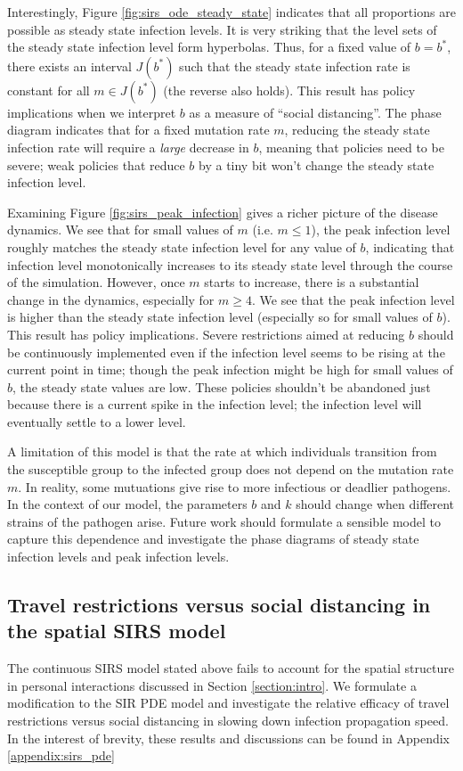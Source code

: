 \documentclass[12pt, reqno]{amsart}
\begin{document}
    Interestingly, Figure \ref{fig:sirs_ode_steady_state} indicates that all proportions are possible as steady state infection levels. It is very striking that the level sets of the steady state infection level form hyperbolas. Thus, for a fixed value of \(b=b^*\), there exists an interval \(J(b^*)\) such that the steady state infection rate is constant for all \(m \in J(b^*)\) (the reverse also holds). This result has policy implications when we interpret \(b\) as a measure of ``social distancing''. The phase diagram indicates that for a fixed mutation rate \(m\), reducing the steady state infection rate will require a \emph{large} decrease in \(b\), meaning that policies need to be severe; weak policies that reduce \(b\) by a tiny bit won't change the steady state infection level.

    Examining Figure \ref{fig:sirs_peak_infection} gives a richer picture of the disease dynamics. We see that for small values of \(m\) (i.e. \(m \leq 1\)), the peak infection level roughly matches the steady state infection level for any value of \(b\), indicating that infection level monotonically increases to its steady state level through the course of the simulation. However, once \(m\) starts to increase, there is a substantial change in the dynamics, especially for \(m \geq 4\). We see that the peak infection level is higher than the steady state infection level (especially so for small values of \(b\)). This result has policy implications. Severe restrictions aimed at reducing \(b\) should be continuously implemented even if the infection level seems to be rising at the current point in time; though the peak infection might be high for small values of \(b\), the steady state values are low. These policies shouldn't be abandoned just because there is a current spike in the infection level; the infection level will eventually settle to a lower level.

    A limitation of this model is that the rate at which individuals transition from the susceptible group to the infected group does not depend on the mutation rate \(m\). In reality, some mutuations give rise to more infectious or deadlier pathogens. In the context of our model, the parameters \(b\) and \(k\) should change when different strains of the pathogen arise. Future work should formulate a sensible model to capture this dependence and investigate the phase diagrams of steady state infection levels and peak infection levels. 

    \subsection{Travel restrictions versus social distancing in the spatial SIRS model}
    The continuous SIRS model stated above fails to account for the spatial structure in personal interactions discussed in Section \ref{section:intro}. We formulate a modification to the SIR PDE model and investigate the relative efficacy of travel restrictions versus social distancing in slowing down infection propagation speed. In the interest of brevity, these results and discussions can be found in Appendix \ref{appendix:sirs_pde}
    
\end{document}
